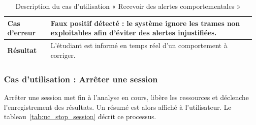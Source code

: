 \begin{table}[H]
\begin{tabular}{|>{\raggedright\arraybackslash}p{3.5cm}|>{\raggedright\arraybackslash}p{9.5cm}|}
\textbf{Cas d'erreur} &
Faux positif détecté : le système ignore les trames non exploitables afin d'éviter des alertes injustifiées.
\\ \hline

\textbf{Résultat} &
L'étudiant est informé en temps réel d'un comportement à corriger.
\\ \hline

\end{tabular}

\caption{Description du cas d'utilisation « Recevoir des alertes comportementales »}
\label{tab:uc_alerts}

\end{table}

\clearpage


\subsubsection{Cas d'utilisation : Arrêter une session}

Arrêter une session met fin à l'analyse en cours, libère les ressources et déclenche l'enregistrement des résultats. Un résumé est alors affiché à l'utilisateur. Le tableau~\ref{tab:uc_stop_session} décrit ce processus.

